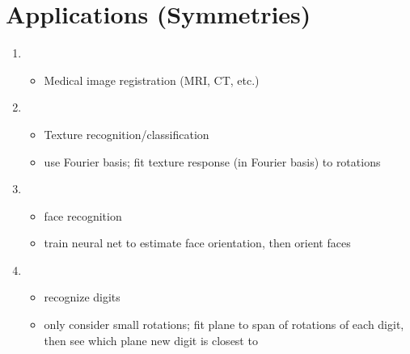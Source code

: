 \documentclass[12pt]{article}
\begin{document}
\section{Applications (Symmetries)}

\begin{enumerate}

\item {}
\begin{itemize}
	\item Medical image registration (MRI, CT, etc.)
\end{itemize}

\item {}
\begin{itemize}
\item Texture recognition/classification
\item use Fourier basis; fit texture response (in Fourier basis) to rotations 
\end{itemize}

\item {}
\begin{itemize}
	\item face recognition
	\item train neural net to estimate face orientation, then orient faces
\end{itemize}

\item {}
\begin{itemize}
	\item recognize digits
	\item only consider small rotations; fit plane to span of rotations of each digit, then see which plane new digit is closest to
\end{itemize}

\end{enumerate}
\end{document}
